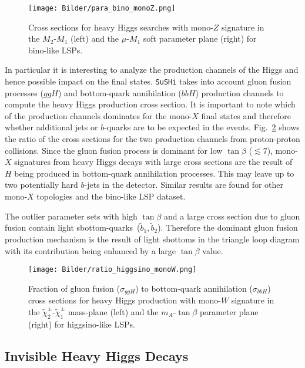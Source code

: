 \documentclass[11pt,a4paper]{article}
\begin{document}
\begin{figure}[h]
\centering
\texttt{[image: Bilder/para\_bino\_monoZ.png]}
\caption{Cross sections for heavy Higgs searches with mono-$Z$ signature in the $M_2$-$M_1$ (left) and the $\mu$-$M_1$ soft parameter plane (right) for bino-like LSPs.}\label{fig_para_3D_bino}
\end{figure}


In particular it is interesting to analyze the production channels of the Higgs and hence possible impact on the final states. \texttt{SuSHi} takes into account gluon fusion processes ($ggH$) and bottom-quark annihilation ($bbH$) production channels to compute the heavy Higgs production cross section. It is important to note which of the production channels dominates for the mono-$X$ final states and therefore whether additional jets or $b$-quarks are to be expected in the events. Fig.~\ref{fig_productionchannel} shows the ratio of the cross sections for the two production channels from proton-proton collisions. Since the gluon fusion process is dominant for low $\tan\beta$ ($\lesssim 7$), mono-$X$ signatures from heavy Higgs decays with large cross sections are the result of $H$ being produced in bottom-quark annihilation processes. This may leave up to two potentially hard $b$-jets in the detector. Similar results are found for other mono-$X$ topologies and the bino-like LSP dataset.

The outlier parameter sets with high $\tan\beta$ and a large cross section due to gluon fusion contain light sbottom-quarks~($\tilde{b}_1, \tilde{b}_2$). Therefore the dominant gluon fusion production mechanism is the result of light sbottoms in the triangle loop diagram with its contribution being enhanced by a large $\tan\beta$ value.

\begin{figure}[h]
\centering
\texttt{[image: Bilder/ratio\_higgsino\_monoW.png]}
\caption{Fraction of gluon fusion ($\sigma_{ggH}$) to bottom-quark annihilation ($\sigma_{bbH}$) cross sections for heavy Higgs production with mono-$W$ signature in the $\tilde{\chi}^\pm_2$-$\tilde{\chi}^\pm_1$ mass-plane (left) and the $m_A$-$\tan\beta$ parameter plane (right) for higgsino-like LSPs.}\label{fig_productionchannel}
\end{figure}

\subsection*{Invisible Heavy Higgs Decays}\label{sec_inv}
\end{document}
